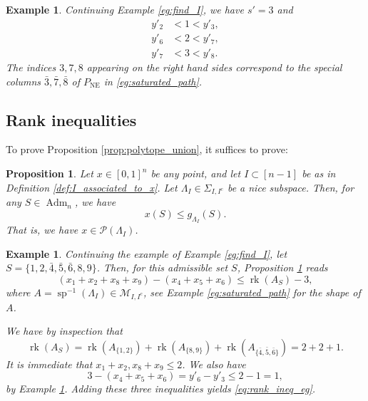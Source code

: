 \documentclass[12pt]{amsart}
\newtheorem{example}[definition]{Example}
\newtheorem{proposition}[definition]{Proposition}
\DeclareMathOperator{\Adm}{Adm}
\DeclareMathOperator{\NE}{NE}
\DeclareMathOperator{\ssp}{sp}
\DeclareMathOperator{\rk}{rk}
\newcommand{\cM}{\mathcal{M}}
\newcommand{\cP}{\mathcal{P}}
\begin{document}
\begin{example}\label{eg:dual_ineqs}
    Continuing Example \ref{eg:find_I}, we have $s'=3$ and 
    \begin{align*}
        y'_2&<1<y'_3,\\
        y'_6&<2<y'_7,\\
        y'_7&<3<y'_8.
    \end{align*}
    The indices $3,7,8$ appearing on the right hand sides correspond to the special columns $\bar3,\bar7,\bar8$ of $P_{\NE}$ in \ref{eg:saturated_path}.
\end{example}

\subsection{Rank inequalities}\label{sec:rank_ineqs}

To prove Proposition \ref{prop:polytope_union}, it suffices to prove:

\begin{proposition}\label{prop:x_in_P(I)}
    Let $x\in[0,1]^n$ be any point, and let $I\subset [n-1]$ be as in Definition \ref{def:I_associated_to_x}. Let $\Lambda_I\in\Sigma_{I,I^c}$ be a nice subspace. Then, for any $S\in\Adm_n$, we have
    \begin{equation*}
        x(S)\le g_{\Lambda_I}(S).
    \end{equation*}
    That is, we have $x\in\cP(\Lambda_I)$.
\end{proposition}

\begin{example}\label{eg:polytope_ineq}
    Continuing the example of Example \ref{eg:find_I}, let $S=\{1,2,\bar4,\bar5,\bar6,8,9\}$. Then, for this admissible set $S$, Proposition \ref{prop:x_in_P(I)} reads
    \begin{equation}\label{eq:rank_ineq_eg}
        (x_1+x_2+x_8+x_9)-(x_4+x_5+x_6)\le \rk(A_S)-3,
    \end{equation}
    where $A=\ssp^{-1}(\Lambda_I)\in\cM_{I,I^c}$, see Example \ref{eg:saturated_path} for the shape of $A$.

    We have by inspection that
    \begin{equation*}
        \rk(A_S)=\rk(A_{\{1,2\}})+\rk(A_{\{8,9\}})+\rk(A_{\{\bar4,\bar5,\bar6\}})=2+2+1.
    \end{equation*}
    It is immediate that $x_1+x_2,x_8+x_9\le 2$. We also have
    \begin{equation*}
        3-(x_4+x_5+x_6)=y'_6-y'_3\le 2-1=1,
    \end{equation*}
    by Example \ref{eg:dual_ineqs}. Adding these three inequalities yields \eqref{eq:rank_ineq_eg}.
\end{example}
\end{document}
